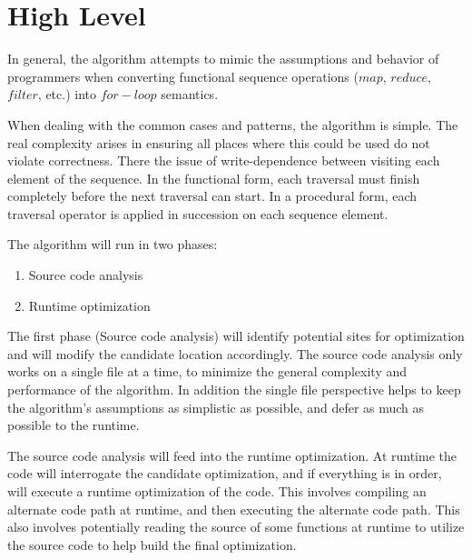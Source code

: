 \section{High Level}
In general, the algorithm attempts to mimic the assumptions and behavior of programmers when converting functional sequence operations ($map$, $reduce$, $filter$, etc.) into $for-loop$ semantics.

When dealing with the common cases and patterns, the algorithm is simple.  The real complexity arises in ensuring all places where this could be used do not violate correctness.  There the issue of write-dependence between visiting each element of the sequence.  In the functional form, each traversal must finish completely before the next traversal can start.  In a procedural form, each traversal operator is applied in succession on each sequence element.  

The algorithm will run in two phases:
  \begin{enumerate}
    \item Source code analysis
    \item Runtime optimization
  \end{enumerate}

The first phase (Source code analysis) will identify potential sites for optimization and will modify the candidate location accordingly.  The source code analysis only works on a single file at a time, to minimize the general complexity and performance of the algorithm. In addition the single file perspective helps to keep the algorithm's assumptions as simplistic as possible, and defer as much as possible to the runtime.

The source code analysis will feed into the runtime optimization.  At runtime the code will interrogate the candidate optimization, and if everything is in order, will execute a runtime optimization of the code.  This involves compiling an alternate code path at runtime, and then executing the alternate code path.  This also involves potentially reading the source of some functions at runtime to utilize the source code to help build the final optimization.
